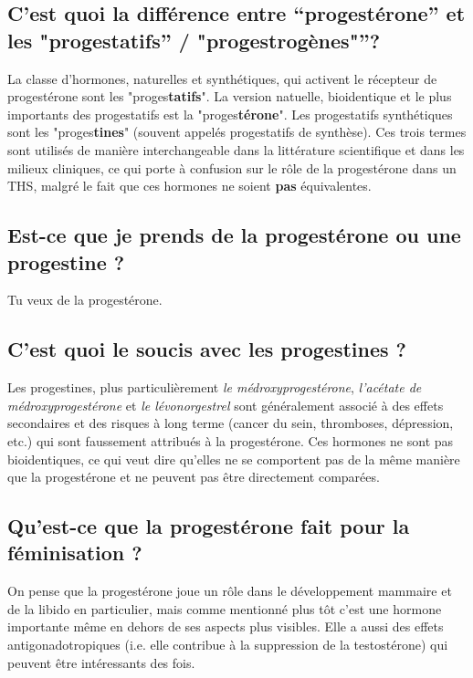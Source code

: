 \documentclass{article}
\begin{document}
\subsection{C'est quoi la différence entre “progestérone” et les "progestatifs” / "progestrogènes"”?}

La classe d'hormones, naturelles et synthétiques, qui activent le récepteur de progestérone sont les "proges\textbf{tatifs}". La version natuelle, bioidentique et le plus importants des progestatifs est la "proges\textbf{térone}". Les progestatifs synthétiques sont les "proges\textbf{tines}" (souvent appelés progestatifs de synthèse). Ces trois termes sont utilisés de manière interchangeable dans la littérature scientifique et dans les milieux cliniques, ce qui porte à confusion sur le rôle de la progestérone dans un THS, malgré le fait que ces hormones ne soient \textbf{pas} équivalentes.

\subsection{Est-ce que je prends de la progestérone ou une progestine ?}

Tu veux de la progestérone.

\subsection{C'est quoi le soucis avec les progestines ?}

Les progestines, plus particulièrement \textit{le médroxyprogestérone}, \textit{l'acétate de médroxyprogestérone} et \textit{le lévonorgestrel} sont généralement associé à des effets secondaires et des risques à long terme (cancer du sein, thromboses, dépression, etc.) qui sont faussement attribués à la progestérone. Ces hormones ne sont pas bioidentiques, ce qui veut dire qu'elles ne se comportent pas de la même manière que la progestérone et ne peuvent pas être directement comparées.

\subsection{Qu'est-ce que la progestérone fait pour la féminisation ?}

On pense que la progestérone joue un rôle dans le développement mammaire et de la libido en particulier, mais comme mentionné plus tôt c'est une hormone importante même en dehors de ses aspects plus visibles. Elle a aussi des effets antigonadotropiques (i.e. elle contribue à la suppression de la testostérone) qui peuvent être intéressants des fois. 
\end{document}

